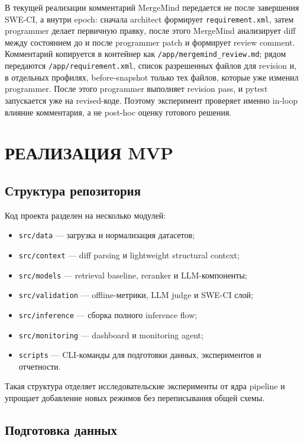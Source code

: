 \documentclass[14pt,a4paper]{extreport}
\begin{document}
В текущей реализации комментарий MergeMind передается не после завершения
SWE-CI, а внутри epoch: сначала architect формирует \texttt{requirement.xml},
затем programmer делает первичную правку, после этого MergeMind анализирует
diff между состоянием до и после programmer patch и формирует review comment.
Комментарий копируется в контейнер как \texttt{/app/mergemind\_review.md};
рядом передаются \texttt{/app/requirement.xml}, список разрешенных файлов для
revision и, в отдельных профилях, before-snapshot только тех файлов, которые
уже изменил programmer. После этого programmer выполняет revision pass, и
pytest запускается уже на revised-коде. Поэтому эксперимент проверяет именно
in-loop влияние комментария, а не post-hoc оценку готового решения.

\chapter{РЕАЛИЗАЦИЯ MVP}

\section{Структура репозитория}

Код проекта разделен на несколько модулей:

\begin{itemize}
  \item \texttt{src/data} --- загрузка и нормализация датасетов;
  \item \texttt{src/context} --- diff parsing и lightweight structural context;
  \item \texttt{src/models} --- retrieval baseline, reranker и LLM-компоненты;
  \item \texttt{src/validation} --- offline-метрики, LLM judge и SWE-CI слой;
  \item \texttt{src/inference} --- сборка полного inference flow;
  \item \texttt{src/monitoring} --- dashboard и monitoring agent;
  \item \texttt{scripts} --- CLI-команды для подготовки данных, экспериментов и
    отчетности.
\end{itemize}

Такая структура отделяет исследовательские эксперименты от ядра pipeline и
упрощает добавление новых режимов без переписывания общей схемы.

\section{Подготовка данных}
\end{document}

